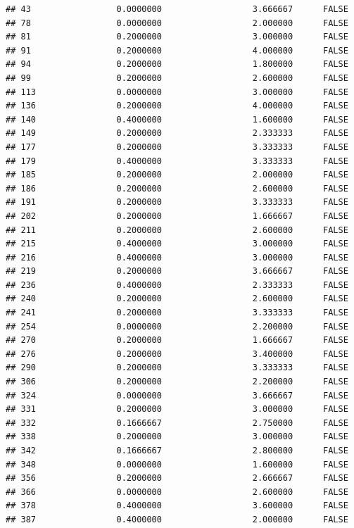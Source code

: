 \documentclass[
]{article}
\begin{document}
\begin{verbatim}
## 43                 0.0000000                  3.666667      FALSE
## 78                 0.0000000                  2.000000      FALSE
## 81                 0.2000000                  3.000000      FALSE
## 91                 0.2000000                  4.000000      FALSE
## 94                 0.2000000                  1.800000      FALSE
## 99                 0.2000000                  2.600000      FALSE
## 113                0.0000000                  3.000000      FALSE
## 136                0.2000000                  4.000000      FALSE
## 140                0.4000000                  1.600000      FALSE
## 149                0.2000000                  2.333333      FALSE
## 177                0.2000000                  3.333333      FALSE
## 179                0.4000000                  3.333333      FALSE
## 185                0.2000000                  2.000000      FALSE
## 186                0.2000000                  2.600000      FALSE
## 191                0.2000000                  3.333333      FALSE
## 202                0.2000000                  1.666667      FALSE
## 211                0.2000000                  2.600000      FALSE
## 215                0.4000000                  3.000000      FALSE
## 216                0.4000000                  3.000000      FALSE
## 219                0.2000000                  3.666667      FALSE
## 236                0.4000000                  2.333333      FALSE
## 240                0.2000000                  2.600000      FALSE
## 241                0.2000000                  3.333333      FALSE
## 254                0.0000000                  2.200000      FALSE
## 270                0.2000000                  1.666667      FALSE
## 276                0.2000000                  3.400000      FALSE
## 290                0.2000000                  3.333333      FALSE
## 306                0.2000000                  2.200000      FALSE
## 324                0.0000000                  3.666667      FALSE
## 331                0.2000000                  3.000000      FALSE
## 332                0.1666667                  2.750000      FALSE
## 338                0.2000000                  3.000000      FALSE
## 342                0.1666667                  2.800000      FALSE
## 348                0.0000000                  1.600000      FALSE
## 356                0.2000000                  2.666667      FALSE
## 366                0.0000000                  2.600000      FALSE
## 378                0.4000000                  3.600000      FALSE
## 387                0.4000000                  2.000000      FALSE

\end{verbatim}
\end{document}
